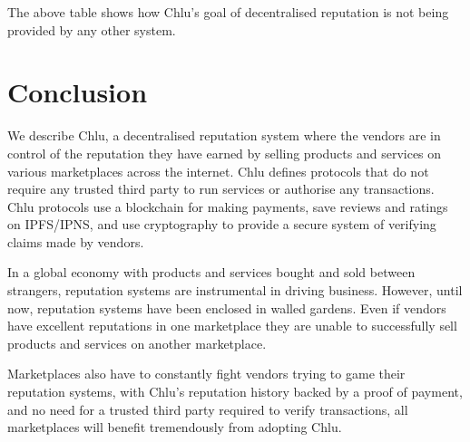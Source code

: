 \documentclass[a4paper]{article}
\begin{document}
The above table shows how Chlu's goal of decentralised reputation is
not being provided by any other system.

\section{Conclusion}

We describe Chlu, a decentralised reputation system where the vendors
are in control of the reputation they have earned by selling products
and services on various marketplaces across the internet. Chlu defines
protocols that do not require any trusted third party to run services
or authorise any transactions. Chlu protocols use a blockchain for
making payments, save reviews and ratings on IPFS/IPNS, and use
cryptography to provide a secure system of verifying claims made by
vendors.

In a global economy with products and services bought and sold between
strangers, reputation systems are instrumental in driving
business. However, until now, reputation systems have been enclosed in
walled gardens. Even if vendors have excellent reputations in one
marketplace they are unable to successfully sell products and services
on another marketplace.

Marketplaces also have to constantly fight vendors trying to game
their reputation systems, with Chlu's reputation history backed by a
proof of payment, and no need for a trusted third party required to
verify transactions, all marketplaces will benefit tremendously from
adopting Chlu.

{}

\end{document}
